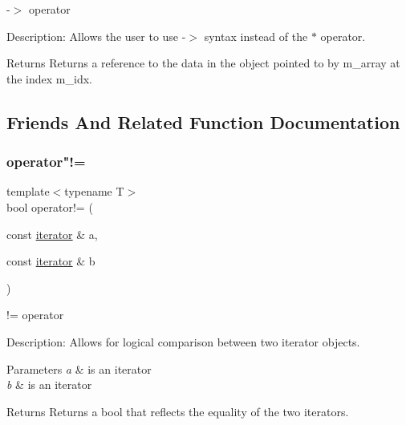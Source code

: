 -\/$>$ operator 

Description\+: Allows the user to use -\/$>$ syntax instead of the $\ast$ operator. \begin{DoxyReturn}{Returns}
Returns a reference to the data in the object pointed to by m\+\_\+array at the index m\+\_\+idx. 
\end{DoxyReturn}


\subsection{Friends And Related Function Documentation}
\mbox{\label{classnVect_1_1iterator_a55a8ee0e80dad1a7da9d751c25bc0386}} 
\subsubsection{\texorpdfstring{operator"!=}{operator!=}}
{\footnotesize\ttfamily template$<$typename T$>$ \\
bool operator!= (\begin{DoxyParamCaption}\item[{const \hyperlink{classnVect_1_1iterator}{iterator} \&}]{a,  }\item[{const \hyperlink{classnVect_1_1iterator}{iterator} \&}]{b }\end{DoxyParamCaption})\hspace{0.3cm}{\ttfamily [friend]}}



!= operator 

Description\+: Allows for logical comparison between two iterator objects. 
\begin{DoxyParams}{Parameters}
{\em a} & is an iterator \\
\hline
{\em b} & is an iterator \\
\hline
\end{DoxyParams}
\begin{DoxyReturn}{Returns}
Returns a bool that reflects the equality of the two iterators. 
\end{DoxyReturn}
\mbox{\label{classnVect_1_1iterator_a81d10d7799462c7ca5e7cf19119ca356}} 
